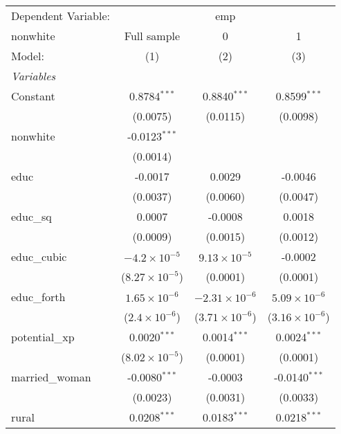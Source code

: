\begingroup
\centering
\begin{tabular}{lccc}
   \tabularnewline \midrule \midrule
   Dependent Variable: & \multicolumn{3}{c}{emp}\\
   nonwhite        & Full sample             & 0                       & 1 \\   
   Model:          & (1)                     & (2)                     & (3)\\  
   \midrule
   \emph{Variables}\\
   Constant        & 0.8784$^{***}$          & 0.8840$^{***}$          & 0.8599$^{***}$\\   
                   & (0.0075)                & (0.0115)                & (0.0098)\\   
   nonwhite        & -0.0123$^{***}$         &                         &   \\   
                   & (0.0014)                &                         &   \\   
   educ            & -0.0017                 & 0.0029                  & -0.0046\\   
                   & (0.0037)                & (0.0060)                & (0.0047)\\   
   educ\_sq        & 0.0007                  & -0.0008                 & 0.0018\\   
                   & (0.0009)                & (0.0015)                & (0.0012)\\   
   educ\_cubic     & $-4.2\times 10^{-5}$    & $9.13\times 10^{-5}$    & -0.0002\\   
                   & ($8.27\times 10^{-5}$)  & (0.0001)                & (0.0001)\\   
   educ\_forth     & $1.65\times 10^{-6}$    & $-2.31\times 10^{-6}$   & $5.09\times 10^{-6}$\\    
                   & ($2.4\times 10^{-6}$)   & ($3.71\times 10^{-6}$)  & ($3.16\times 10^{-6}$)\\    
   potential\_xp   & 0.0020$^{***}$          & 0.0014$^{***}$          & 0.0024$^{***}$\\   
                   & ($8.02\times 10^{-5}$)  & (0.0001)                & (0.0001)\\   
   married\_woman  & -0.0080$^{***}$         & -0.0003                 & -0.0140$^{***}$\\   
                   & (0.0023)                & (0.0031)                & (0.0033)\\   
   rural           & 0.0208$^{***}$          & 0.0183$^{***}$          & 0.0218$^{***}$\\   

\end{tabular}
